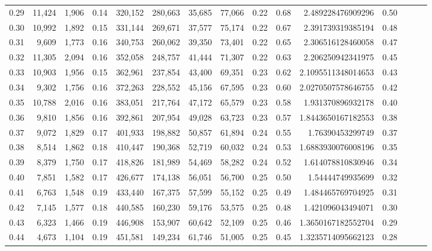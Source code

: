 \begin{tabular}{rrrrrrrrrrrrrrr}
0.29 &  11,424 &  1,906 &  0.14 &  320,152 &  280,663 &   35,685 &   77,066 &  0.22 &  0.68 &     2.489228476909296 &      0.50 \\
0.30 &  10,992 &  1,892 &  0.15 &  331,144 &  269,671 &   37,577 &   75,174 &  0.22 &  0.67 &     2.391739319385194 &      0.48 \\
0.31 &   9,609 &  1,773 &  0.16 &  340,753 &  260,062 &   39,350 &   73,401 &  0.22 &  0.65 &     2.306516128460058 &      0.47 \\
0.32 &  11,305 &  2,094 &  0.16 &  352,058 &  248,757 &   41,444 &   71,307 &  0.22 &  0.63 &     2.206250942341975 &      0.45 \\
0.33 &  10,903 &  1,956 &  0.15 &  362,961 &  237,854 &   43,400 &   69,351 &  0.23 &  0.62 &    2.1095511348014653 &      0.43 \\
0.34 &   9,302 &  1,756 &  0.16 &  372,263 &  228,552 &   45,156 &   67,595 &  0.23 &  0.60 &    2.0270507578646755 &      0.42 \\
0.35 &  10,788 &  2,016 &  0.16 &  383,051 &  217,764 &   47,172 &   65,579 &  0.23 &  0.58 &     1.931370896932178 &      0.40 \\
0.36 &   9,810 &  1,856 &  0.16 &  392,861 &  207,954 &   49,028 &   63,723 &  0.23 &  0.57 &    1.8443650167182553 &      0.38 \\
0.37 &   9,072 &  1,829 &  0.17 &  401,933 &  198,882 &   50,857 &   61,894 &  0.24 &  0.55 &      1.76390453299749 &      0.37 \\
0.38 &   8,514 &  1,862 &  0.18 &  410,447 &  190,368 &   52,719 &   60,032 &  0.24 &  0.53 &    1.6883930076008196 &      0.35 \\
0.39 &   8,379 &  1,750 &  0.17 &  418,826 &  181,989 &   54,469 &   58,282 &  0.24 &  0.52 &     1.614078810830946 &      0.34 \\
0.40 &   7,851 &  1,582 &  0.17 &  426,677 &  174,138 &   56,051 &   56,700 &  0.25 &  0.50 &      1.54444749935699 &      0.32 \\
0.41 &   6,763 &  1,548 &  0.19 &  433,440 &  167,375 &   57,599 &   55,152 &  0.25 &  0.49 &     1.484465769704925 &      0.31 \\
0.42 &   7,145 &  1,577 &  0.18 &  440,585 &  160,230 &   59,176 &   53,575 &  0.25 &  0.48 &     1.421096043494071 &      0.30 \\
0.43 &   6,323 &  1,466 &  0.19 &  446,908 &  153,907 &   60,642 &   52,109 &  0.25 &  0.46 &    1.3650167182552704 &      0.29 \\
0.44 &   4,673 &  1,104 &  0.19 &  451,581 &  149,234 &   61,746 &   51,005 &  0.25 &  0.45 &    1.3235714095662123 &      0.28 \\

\end{tabular}
